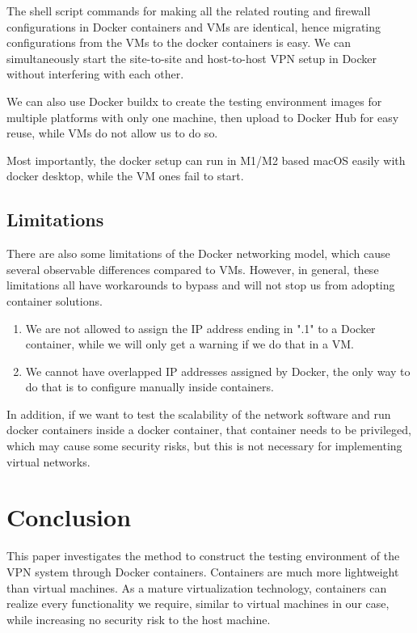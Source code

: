 \documentclass[article]{aaltoseries}
\begin{document}
The shell script commands for making all the related routing and firewall configurations in Docker containers and VMs are identical, hence migrating configurations from the VMs to the docker containers is easy. We can simultaneously start the site-to-site and host-to-host VPN setup in Docker without interfering with each other.

We can also use Docker buildx \cite{dockermultiplatform} to create the testing environment images for multiple platforms with only one machine, then upload to Docker Hub for easy reuse, while VMs do not allow us to do so.

Most importantly, the docker setup can run in M1/M2 based macOS easily with docker desktop, while the VM ones fail to start.

\subsection{Limitations}

There are also some limitations of the Docker networking model, which cause several observable differences compared to VMs. However, in general, these limitations all have workarounds to bypass and will not stop us from adopting container solutions.

\begin{enumerate}
\setlength{\itemsep}{0pt}
\setlength{\parsep}{0pt}
\setlength{\parskip}{0pt}
\item We are not allowed to assign the IP address ending in ".1" to a Docker container, while we will only get a warning if we do that in a VM.
\item We cannot have overlapped IP addresses assigned by Docker, the only way to do that is to configure manually inside containers.
\end{enumerate}

In addition, if we want to test the scalability of the network software and run docker containers inside a docker container, that container needs to be privileged, which may cause some security risks, but this is not necessary for implementing virtual networks.



\section{Conclusion}

This paper investigates the method to construct the testing environment of the VPN system through Docker containers. Containers are much more lightweight than virtual machines. As a mature virtualization technology, containers can realize every functionality we require, similar to virtual machines in our case, while increasing no security risk to the host machine.
\end{document}
